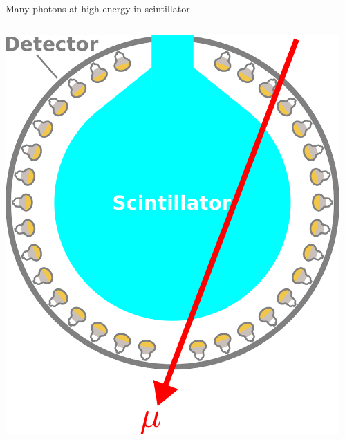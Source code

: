 \documentclass[14pt]{beamer}
\begin{document}
\begin{frame}{Many photons at high energy in scintillator}
	\begin{columns}[t]
		\begin{block}{}
			\includegraphics[width=\linewidth]{through_going_muon-with_scintillator.pdf}
		\end{block}
		\begin{block}{}
\end{block}
\end{columns}
\end{frame}
\end{document}
